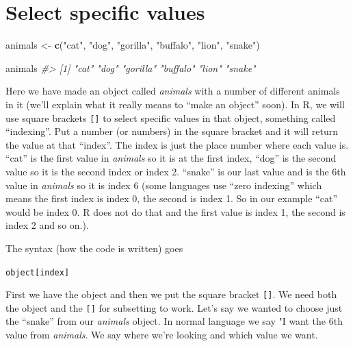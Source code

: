 \documentclass[
  12pt,
]{book}
\newenvironment{Shaded}{\begin{snugshade}}{\end{snugshade}}
\newcommand{\CommentTok}[1]{\textcolor[rgb]{0.56,0.35,0.01}{\textit{#1}}}
\newcommand{\KeywordTok}[1]{\textcolor[rgb]{0.13,0.29,0.53}{\textbf{#1}}}
\newcommand{\NormalTok}[1]{#1}
\newcommand{\StringTok}[1]{\textcolor[rgb]{0.31,0.60,0.02}{#1}}
\begin{document}
\hypertarget{select-specific-values}{%
\section{Select specific values}\label{select-specific-values}}

\begin{Shaded}
\begin{Highlighting}[]
\NormalTok{animals <{-}}\StringTok{ }\KeywordTok{c}\NormalTok{(}\StringTok{"cat"}\NormalTok{, }\StringTok{"dog"}\NormalTok{, }\StringTok{"gorilla"}\NormalTok{, }\StringTok{"buffalo"}\NormalTok{, }\StringTok{"lion"}\NormalTok{, }\StringTok{"snake"}\NormalTok{)}
\end{Highlighting}
\end{Shaded}

\begin{Shaded}
\begin{Highlighting}[]
\NormalTok{animals}
\CommentTok{\#> [1] "cat"     "dog"     "gorilla" "buffalo" "lion"    "snake"}
\end{Highlighting}
\end{Shaded}

Here we have made an object called \emph{animals} with a number of different animals in it (we'll explain what it really means to ``make an object'' soon). In R, we will use square brackets \texttt{{[}{]}} to select specific values in that object, something called ``indexing''. Put a number (or numbers) in the square bracket and it will return the value at that ``index''. The index is just the place number where each value is. ``cat'' is the first value in \emph{animals} so it is at the first index, ``dog'' is the second value so it is the second index or index 2. ``snake'' is our last value and is the 6th value in \emph{animals} so it is index 6 (some languages use ``zero indexing'' which means the first index is index 0, the second is index 1. So in our example ``cat'' would be index 0. R does not do that and the first value is index 1, the second is index 2 and so on.).

The syntax (how the code is written) goes

\texttt{object{[}index{]}}

First we have the object and then we put the square bracket \texttt{{[}{]}}. We need both the object and the \texttt{{[}{]}} for subsetting to work. Let's say we wanted to choose just the ``snake'' from our \emph{animals} object. In normal language we say "I want the 6th value from \emph{animals}. We say where we're looking and which value we want.
\end{document}
